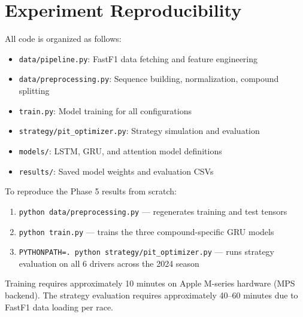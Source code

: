 \appendix
\section{Experiment Reproducibility}

All code is organized as follows:

\begin{itemize}[noitemsep]
    \item \texttt{data/pipeline.py}: FastF1 data fetching and feature engineering
    \item \texttt{data/preprocessing.py}: Sequence building, normalization, compound splitting
    \item \texttt{train.py}: Model training for all configurations
    \item \texttt{strategy/pit\_optimizer.py}: Strategy simulation and evaluation
    \item \texttt{models/}: LSTM, GRU, and attention model definitions
    \item \texttt{results/}: Saved model weights and evaluation CSVs
\end{itemize}

To reproduce the Phase 5 results from scratch:
\begin{enumerate}[noitemsep]
    \item \texttt{python data/preprocessing.py} --- regenerates training and test tensors
    \item \texttt{python train.py} --- trains the three compound-specific GRU models
    \item \texttt{PYTHONPATH=. python strategy/pit\_optimizer.py} --- runs strategy evaluation on all 6 drivers across the 2024 season
\end{enumerate}

Training requires approximately 10 minutes on Apple M-series hardware (MPS backend). The strategy evaluation requires approximately 40--60 minutes due to FastF1 data loading per race.
